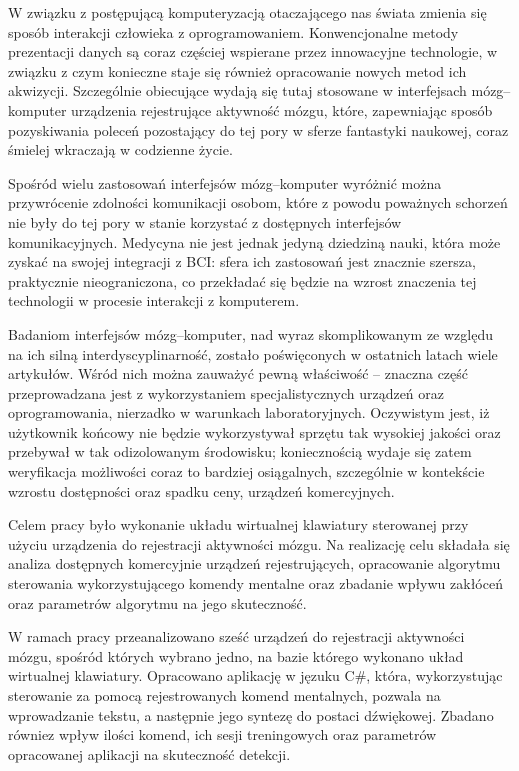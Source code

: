 \documentclass[skorowidz,skroty]{dyplomWEZUT}
\begin{document}
\begin{wprowadzenie}
    W związku z postępującą komputeryzacją otaczającego nas świata zmienia się sposób interakcji człowieka z oprogramowaniem. Konwencjonalne metody prezentacji danych są coraz częściej wspierane przez innowacyjne technologie, w związku z czym konieczne staje się również opracowanie nowych metod ich akwizycji. Szczególnie obiecujące wydają się tutaj stosowane w interfejsach mózg--komputer urządzenia rejestrujące aktywność mózgu, które, zapewniając sposób pozyskiwania poleceń pozostający do tej pory w sferze fantastyki naukowej, coraz śmielej wkraczają w codzienne życie.

    Spośród wielu zastosowań interfejsów mózg--komputer wyróżnić można przywrócenie zdolności komunikacji osobom, które z powodu poważnych schorzeń nie były do tej pory w stanie korzystać z dostępnych interfejsów komunikacyjnych. Medycyna nie jest jednak jedyną dziedziną nauki, która może zyskać na swojej integracji z BCI: sfera ich zastosowań jest znacznie szersza, praktycznie nieograniczona, co przekładać się będzie na wzrost znaczenia tej technologii w procesie interakcji z komputerem.
    
    Badaniom interfejsów mózg--komputer, nad wyraz skomplikowanym ze względu na ich silną interdyscyplinarność, zostało poświęconych w ostatnich latach wiele artykułów. Wśród nich można zauważyć pewną właściwość -- znaczna część przeprowadzana jest z wykorzystaniem specjalistycznych urządzeń oraz oprogramowania, nierzadko w warunkach laboratoryjnych. Oczywistym jest, iż użytkownik końcowy nie będzie wykorzystywał sprzętu tak wysokiej jakości oraz przebywał w tak odizolowanym środowisku; koniecznością wydaje się zatem weryfikacja możliwości coraz to bardziej osiągalnych, szczególnie w kontekście wzrostu dostępności oraz spadku ceny, urządzeń komercyjnych.
\end{wprowadzenie}

\cel
{
Celem pracy było wykonanie układu wirtualnej klawiatury sterowanej przy użyciu urządzenia do rejestracji aktywności mózgu. Na realizację celu składała się analiza dostępnych komercyjnie urządzeń rejestrujących, opracowanie algorytmu sterowania wykorzystującego komendy mentalne oraz zbadanie wpływu zakłóceń oraz parametrów algorytmu na jego skuteczność. 
}

\zakres
{
W ramach pracy przeanalizowano sześć urządzeń do rejestracji aktywności mózgu, spośród których wybrano jedno, na bazie którego wykonano układ wirtualnej klawiatury. Opracowano aplikację w jęzuku C\#, która, wykorzystując sterowanie za pomocą rejestrowanych komend mentalnych, pozwala na wprowadzanie tekstu, a następnie jego syntezę do postaci dźwiękowej. Zbadano równiez wpływ ilości komend, ich sesji treningowych oraz parametrów opracowanej aplikacji na skuteczność detekcji.
}
\end{document}
